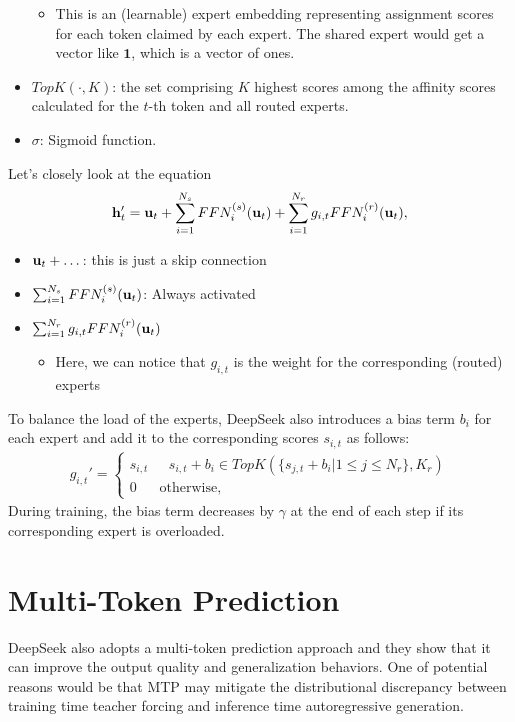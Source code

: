 \begin{itemize}
		\begin{itemize}
			\item This is an (learnable) expert embedding representing assignment scores for each token claimed by each expert. The shared expert would get a vector like $\mathbf{1}$, which is a vector of ones.
		\end{itemize}
	\item $TopK(\cdot, K)$: the set comprising $K$ highest scores among the affinity scores calculated for the $t$-th token and all routed experts.
	\item $\sigma$: Sigmoid function.
\end{itemize}

Let's closely look at the equation
\begin{align*}
	{\mathbf{h}}_t' = {\mathbf{u}}_t+\sum^{N_s}_{i=1}FFN_i^{(s)}({\mathbf{u}}_t)+\sum^{N_r}_{i=1}g_{i,t}FFN_i^{(r)}({\mathbf{u}}_t),
\end{align*}
\begin{itemize}
	\item ${\mathbf{u}}_t+\dots$: this is just a skip connection
	\item $\sum^{N_s}_{i=1}FFN_i^{(s)}({\mathbf{u}}_t)$: Always activated
	\item $\sum^{N_r}_{i=1}g_{i,t}FFN_i^{(r)}({\mathbf{u}}_t)$
		\begin{itemize}
			\item Here, we can notice that $g_{i,t}$ is the weight for the corresponding (routed) experts
		\end{itemize}
\end{itemize}

To balance the load of the experts, DeepSeek also introduces a bias term $b_i$ for each expert and add it to the corresponding scores $s_{i,t}$ as follows:
\begin{align*}
	g_{i,t}' = \begin{cases}
		s_{i,t}&\text{ } s_{i,t}+b_i\in TopK(\{s_{j,t}+b_i|1\leq j \leq N_r\}, K_r)\\
		0&\text{otherwise,}
	\end{cases}
\end{align*}
During training, the bias term decreases by $\gamma$ at the end of each step if its corresponding expert is overloaded. 


\section{Multi-Token Prediction}

DeepSeek also adopts a multi-token prediction approach and they show that it can improve the output quality and generalization behaviors. One of potential reasons would be that MTP may mitigate the distributional discrepancy between training time teacher forcing and inference time autoregressive generation.

